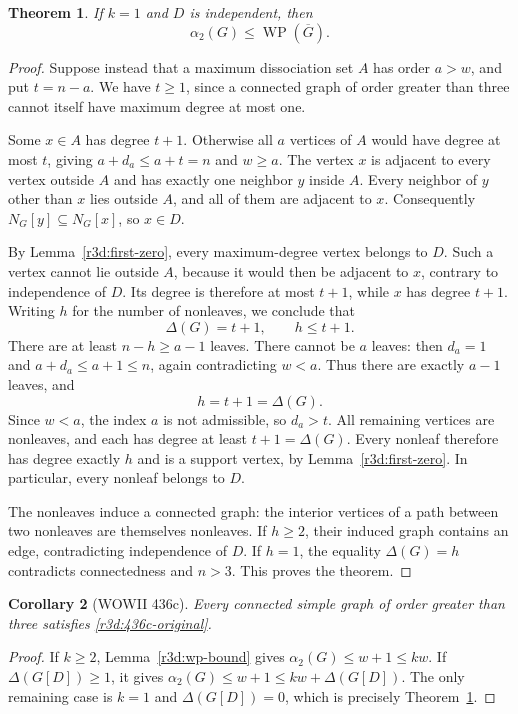 \documentclass[11pt,a4paper]{article}
\newtheorem{theorem}{Theorem}[section]
\newtheorem{corollary}[theorem]{Corollary}
\theoremstyle{remark}
\begin{document}
\begin{theorem}\label{r3d:residual}
If $k=1$ and $D$ is independent, then
\[
 \alpha_2(G)\leq\operatorname{WP}(\overline G).
\]
\end{theorem}
\begin{proof}
Suppose instead that a maximum dissociation set $A$ has order $a>w$, and
put $t=n-a$.  We have $t\geq1$, since a connected graph of order greater
than three cannot itself have maximum degree at most one.

Some $x\in A$ has degree $t+1$.  Otherwise all $a$ vertices of $A$ would
have degree at most $t$, giving $a+d_a\leq a+t=n$ and $w\geq a$.
The vertex $x$ is adjacent to every vertex outside $A$ and has exactly one
neighbor $y$ inside $A$.  Every neighbor of $y$ other than $x$ lies outside
$A$, and all of them are adjacent to $x$.  Consequently
$N_G[y]\subseteq N_G[x]$, so $x\in D$.

By Lemma~\ref{r3d:first-zero}, every maximum-degree vertex belongs
to $D$.  Such a vertex cannot lie outside $A$, because it would then be
adjacent to $x$, contrary to independence of $D$.  Its degree is therefore
at most $t+1$, while $x$ has degree $t+1$.  Writing $h$ for the number of
nonleaves, we conclude that
\[
 \Delta(G)=t+1,\qquad h\leq t+1.
\]
There are at least $n-h\geq a-1$ leaves.  There cannot be $a$ leaves:
then $d_a=1$ and $a+d_a\leq a+1\leq n$, again contradicting $w<a$.
Thus there are exactly $a-1$ leaves, and
\[
 h=t+1=\Delta(G).
\]
Since $w<a$, the index $a$ is not admissible, so $d_a>t$.  All remaining
vertices are nonleaves, and each has degree at least $t+1=\Delta(G)$.
Every nonleaf therefore has degree exactly $h$ and is a support vertex,
by Lemma~\ref{r3d:first-zero}.  In particular, every nonleaf belongs
to $D$.

The nonleaves induce a connected graph: the interior vertices of a path
between two nonleaves are themselves nonleaves.  If $h\geq2$, their
induced graph contains an edge, contradicting independence of $D$.
If $h=1$, the equality $\Delta(G)=h$ contradicts connectedness and $n>3$.
This proves the theorem.
\end{proof}

\begin{corollary}[WOWII 436c]\label{r3d:436c}
Every connected simple graph of order greater than three satisfies
\eqref{r3d:436c-original}.
\end{corollary}
\begin{proof}
If $k\geq2$, Lemma~\ref{r3d:wp-bound} gives
$\alpha_2(G)\leq w+1\leq kw$.  If $\Delta(G[D])\geq1$, it gives
$\alpha_2(G)\leq w+1\leq kw+\Delta(G[D])$.
The only remaining case is $k=1$ and $\Delta(G[D])=0$, which is precisely
Theorem~\ref{r3d:residual}.
\end{proof}
\end{document}
